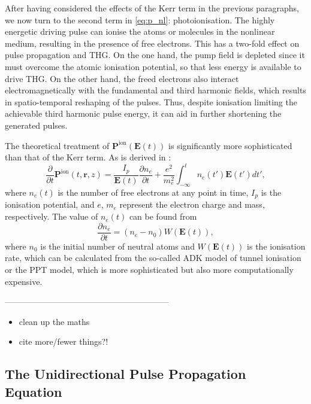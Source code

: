 \documentclass[a4paper]{jpconf}
\begin{document}
After having considered the effects of the Kerr term in the previous paragraphs, we now turn to the second term in \eqref{eq:p_nl}: photoionisation. The highly energetic driving pulse can ionise the atoms or molecules in the nonlinear medium, resulting in the presence of free electrons. This has a two-fold effect on pulse propagation and THG. On the one hand, the pump field is depleted since it must overcome the atomic ionisation potential, so that less energy is available to drive THG. On the other hand, the freed electrons also interact electromagnetically with the fundamental and third harmonic fields, which results in spatio-temporal reshaping of the pulses. Thus, despite ionisation limiting the achievable third harmonic pulse energy, it can aid in further shortening the generated pulses. \par 
The theoretical treatment of $\mathbf{P}^\text{ion}(\mathbf{E}(t))$ is significantly more sophisticated than that of the Kerr term. As is derived in \cite{geissler1999}:
\begin{equation}
\frac{\partial}{\partial t} \mathbf{P}^\text{ion}(t, \mathbf{r},z) = \frac{I_p}{\mathbf{E}(t)} \frac{\partial n_e}{\partial t} + \frac{e^2}{m_e^2} \int_{-\infty}^t n_e(t') \mathbf{E}(t')dt',
\end{equation} 
where $n_e(t)$ is the number of free electrons at any point in time, $I_p$ is the ionisation potential, and $e$, $m_e$ represent the electron charge and mass, respectively. The value of $n_e(t)$ can be found from 
\begin{equation}
\frac{\partial n_e}{\partial t} = (n_e - n_0) W(\mathbf{E}(t)),
\end{equation}
where $n_0$ is the initial number of neutral atoms and $W(\mathbf{E}(t))$ is the ionisation rate, which can be calculated from the so-called ADK model of tunnel ionisation or the PPT model, which is more sophisticated but also more computationally expensive. 

-----------------------------------------------------------
\begin{itemize}
\item clean up the maths 
\item cite more/fewer things?!
\end{itemize}

\subsection{The Unidirectional Pulse Propagation Equation}
\end{document}
